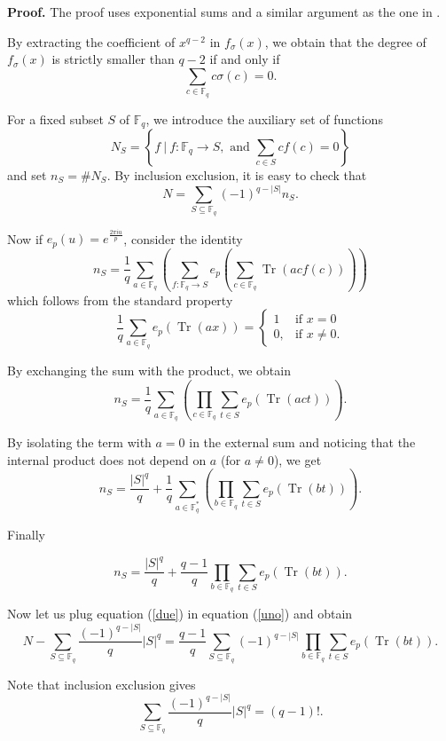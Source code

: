 \documentclass{amsart}
\def\TR{\operatorname{Tr}}
\begin{document}
\noindent\textbf{Proof.} The proof uses exponential sums and
a similar argument as the one in \cite{K}.

By extracting the coefficient of $x^{q-2}$ in $f_\sigma(x)$, we
obtain that the degree of $f_\sigma(x)$ is strictly smaller than
$q-2$ if and only if
$$\sum_{c\in \mathbb F_q} c\sigma(c)=0.$$

For a fixed subset $S$ of $\mathbb F_q$, we introduce the
auxiliary set of functions
$$N_S=\left\{f\ |\ f: \mathbb F_q\longrightarrow S,
\textrm{ and } \sum_{c\in  S} cf(c)=0 \right\}$$ and set $n_S=\#
N_S$. By inclusion exclusion, it is easy to check that
\begin{equation}\label{uno}
N=\sum_{S\subseteq \mathbb F_q}(-1)^{q-|S|}n_S.
\end{equation}

Now if $e_p(u)=e^{\frac{2\pi i u}{p}}$, consider the identity
$$n_S=\frac{1}{q}\sum_{a\in\mathbb F_q}\left(
\sum_{f: \mathbb F_q\longrightarrow S}
e_p(\sum_{c\in\mathbb F_q}\TR(acf(c)))
\right)$$
which follows from the standard property
$$
\frac{1}{q}\sum_{a\in\mathbb F_q}
e_p(\TR(ax))=\begin{cases} 1 & \textrm{if } x=0\\ 0, &
\textrm{if } x\neq0. \end{cases}
$$

By exchanging the sum with the product, we obtain
$$n_S=\frac{1}{q}\sum_{a\in\mathbb F_q}\left(
\prod_{c\in \mathbb F_q}\sum_{t\in S}e_p(\TR(act)) \right).$$

By isolating the term with $a=0$ in the external sum and noticing
that the internal product does not depend on $a$ (for $a\neq0$),
we get
$$n_S=\frac{|S|^q}{q}+\frac{1}{q}
\sum_{a\in\mathbb F_q^*}\left(
\prod_{b\in \mathbb F_q}\sum_{t\in S}
e_p(\TR(bt))
\right).$$

Finally

\begin{equation}\label{due}
n_S=\frac{|S|^q}{q}+\frac{q-1}{q}
\prod_{b\in \mathbb F_q}\sum_{t\in S}
e_p(\TR(bt)).
\end{equation}

Now let us plug equation (\ref{due}) in equation (\ref{uno})
and obtain
$$
N-\sum_{S\subseteq \mathbb F_q}\frac{(-1)^{q-|S|}}{q}|S|^q =
\frac{q-1}{q}\sum_{S\subseteq \mathbb F_q}(-1)^{q-|S|}\prod_{b\in
\mathbb F_q}\sum_{t\in S} e_p(\TR(bt)).
$$

Note that inclusion exclusion gives
$$\sum_{S\subseteq \mathbb F_q}\frac{(-1)^{q-|S|}}{q}|S|^q=(q-1)!.$$
\end{document}
